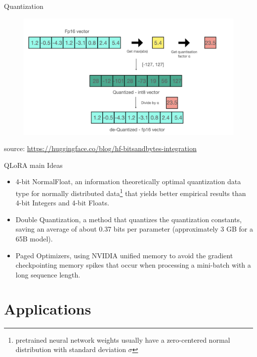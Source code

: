 \documentclass[handout]{beamer}
\begin{document}
\begin{frame}{Quantization}
     \begin{figure}[h]
	\includegraphics[scale = 0.22]{pics/quant-freeze.png}
\end{figure}
source: \url{https://huggingface.co/blog/hf-bitsandbytes-integration}
\end{frame}


\begin{frame}{QLoRA main Ideas}
\begin{scriptsize}
\begin{itemize}
\item  4-bit NormalFloat, an information theoretically optimal quantization data type for normally distributed data\footnote{pretrained neural network weights usually have a zero-centered normal distribution with standard deviation $\sigma$}  that yields better empirical results than 4-bit Integers and 4-bit Floats.
\item Double Quantization, a method that quantizes the quantization constants, saving an average of about 0.37 bits per parameter (approximately 3 GB for a 65B model).
\item Paged Optimizers, using NVIDIA unified memory to avoid the gradient checkpointing memory spikes that occur when processing a mini-batch with a long sequence length.
\end{itemize}
\end{scriptsize}

\end{frame}



\section{Applications}
\end{document}
